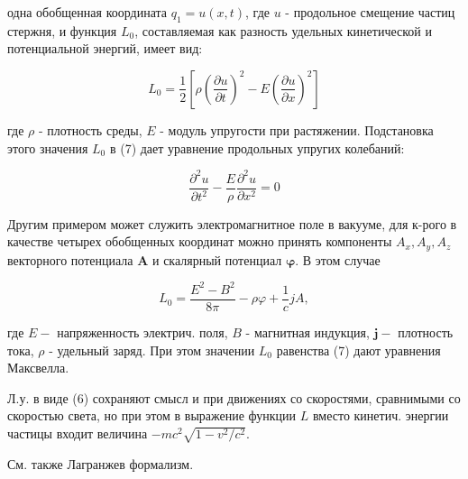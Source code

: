 \documentclass[10pt]{article}
\begin{document}
одна обобщенная координата $q_{1}=u(x, t)$, где $u$ - продольное смещение частиц стержня, и функция $L_{0}$, составляемая как разность удельных кинетической и потенциальной энергий, имеет вид:



\[

L_{0}=\frac{1}{2}\left[\rho\left(\frac{\partial u}{\partial t}\right)^{2}-E\left(\frac{\partial u}{\partial x}\right)^{2}\right]

\]



где $\rho$ - плотность среды, $E$ - модуль упругости при растяжении. Подстановка этого значения $L_{0}$ в (7) дает уравнение продольных упругих колебаний:



\[

\frac{\partial^{2} u}{\partial t^{2}}-\frac{E}{\rho} \frac{\partial^{2} u}{\partial x^{2}}=0

\]



Другим примером может служить электромагнитное поле в вакууме, для к-рого в качестве четырех обобщенных координат можно принять компоненты $A_{x}, A_{y}, A_{z}$ векторного потенциала $\boldsymbol{A}$ и скалярный потенциал $\boldsymbol{\varphi}$. В этом случае



\[

L_{0}=\frac{E^{2}-B^{2}}{8 \pi}-\rho \varphi+\frac{1}{c} j A,

\]



где $E-$ напряженность электрич. поля, $B$ - магнитная индукция, $\boldsymbol{j}-$ плотность тока, $\rho$ - удельный заряд. При этом значении $L_{0}$ равенства (7) дают уравнения Максвелла.



Л.у. в виде (6) сохраняют смысл и при движениях со скоростями, сравнимыми со скоростью света, но при этом в выражение функции $L$ вместо кинетич. энергии частицы входит величина $-m c^{2} \sqrt{1-v^{2} / c^{2}}$.



См. также Лагранжев формализм.
\end{document}
